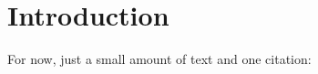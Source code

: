 \chapter{Introduction}

For now, just a small amount of text and one citation: \cite{second_lat_catalog_2012}

